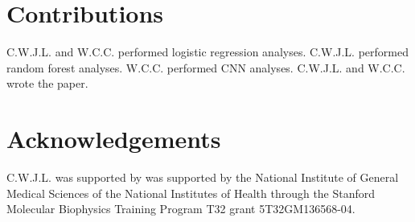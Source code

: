 \documentclass[nofootinbib,pre,superscriptaddress,twocolumn,longbibliography,floatfix]{revtex4-2}
\begin{document}
\section{Contributions}
C.W.J.L. and W.C.C. performed logistic regression analyses.
C.W.J.L. performed random forest analyses.
W.C.C. performed CNN analyses.
C.W.J.L. and W.C.C. wrote the paper.

\section{Acknowledgements}
C.W.J.L. was supported by was supported by the National Institute of General Medical Sciences of the National Institutes of Health through the Stanford Molecular Biophysics Training Program T32 grant 5T32GM136568-04.



\end{document}

